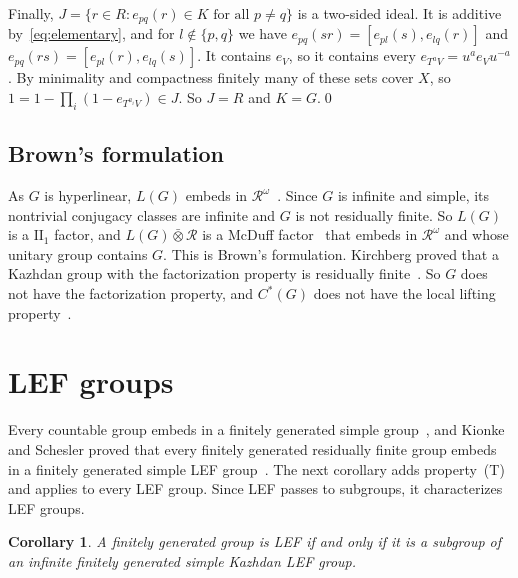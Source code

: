 \documentclass[11pt]{amsart}
\newtheorem{corollary}[theorem]{Corollary}
\begin{document}
Finally, $J=\{r\in R:e_{pq}(r)\in K\text{ for all }p\ne q\}$ is a
two-sided ideal. It is additive by~\eqref{eq:elementary}, and for
$l\notin\{p,q\}$ we have $e_{pq}(sr)=[e_{pl}(s),e_{lq}(r)]$ and
$e_{pq}(rs)=[e_{pl}(r),e_{lq}(s)]$. It contains $e_V$, so it contains
every $e_{T^aV}=u^ae_Vu^{-a}$. By minimality and compactness finitely
many of these sets cover $X$, so
$1=1-\prod_i(1-e_{T^{a_i}V})\in J$. So $J=R$ and $K=G$.\qed

\subsection*{Brown's formulation}
As $G$ is hyperlinear, $L(G)$ embeds in
$\mathcal R^\omega$~\cite[Proposition~7.1]{Ozawa}. Since $G$ is infinite
and simple, its nontrivial conjugacy classes are infinite and $G$ is not
residually finite. So $L(G)$ is a $\mathrm{II}_1$ factor, and
$L(G)\mathbin{\bar\otimes}\mathcal R$ is a McDuff factor~\cite{McDuff}
that embeds in $\mathcal R^\omega$ and whose unitary group contains $G$.
This is Brown's formulation. Kirchberg proved that a Kazhdan group with
the factorization property is residually
finite~\cite[Theorem~1.1]{Kirchberg}. So $G$ does not have the
factorization property, and $C^*(G)$ does not have the local lifting
property~\cite[p.~527]{Ozawa}.

\section{LEF groups}

Every countable group embeds in a finitely generated simple
group~\cite{Gorjuskin,Schupp}, and Kionke and Schesler proved that every
finitely generated residually finite group embeds in a finitely generated
simple LEF group~\cite[Theorem~1.2]{KionkeSchesler}. The next corollary
adds property~\textup{(T)} and applies to every LEF group. Since LEF
passes to subgroups, it characterizes LEF groups.

\begin{corollary}\label{cor:lef}
A finitely generated group is LEF if and only if it is a subgroup of an
infinite finitely generated simple Kazhdan LEF group.
\end{corollary}
\end{document}
